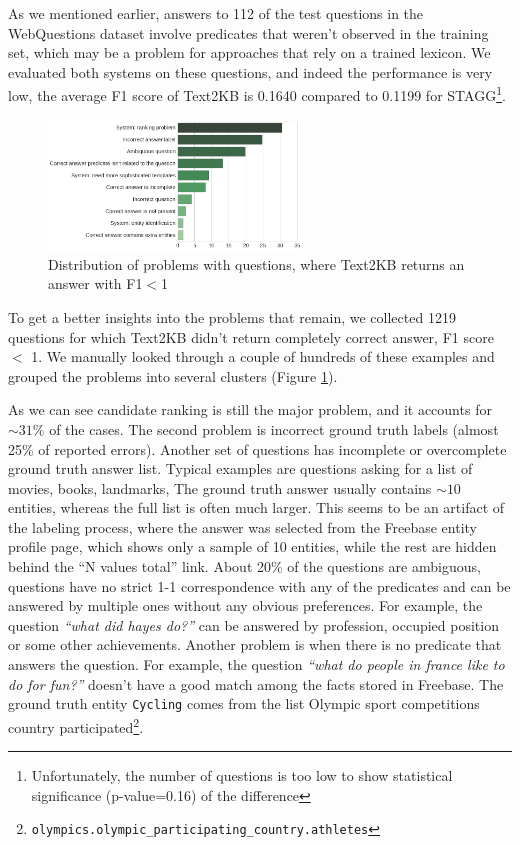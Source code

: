 As we mentioned earlier, answers to 112 of the test questions in the WebQuestions dataset involve predicates that weren't observed in the training set, which may be a problem for approaches that rely on a trained lexicon.
We evaluated both systems on these questions, and indeed the performance is very low, \ie the average F1 score of Text2KB is 0.1640 compared to 0.1199 for STAGG\footnote{Unfortunately, the number of questions is too low to show statistical significance (p-value=0.16) of the difference}.

\begin{figure}
\centering
\includegraphics[width=0.6\textwidth]{img/error_analysis}
\caption{Distribution of problems with questions, where Text2KB returns an answer with F1$<$1}
\label{figure:text2kb:error_analysis}
\end{figure}

To get a better insights into the problems that remain, we collected 1219 questions for which Text2KB didn't return completely correct answer, \ie F1 score $<$ 1.
We manually looked through a couple of hundreds of these examples and grouped the problems into several clusters (Figure \ref{figure:text2kb:error_analysis}).

As we can see candidate ranking is still the major problem, and it accounts for $\sim31\%$ of the cases.
The second problem is incorrect ground truth labels (almost 25\% of reported errors).
Another set of questions has incomplete or overcomplete ground truth answer list.
Typical examples are questions asking for a list of movies, books, landmarks, \etc
The ground truth answer usually contains $\sim10$ entities, whereas the full list is often much larger.
This seems to be an artifact of the labeling process, where the answer was selected from the Freebase entity profile page, which shows only a sample of 10 entities, while the rest are hidden behind the ``N values total'' link.
About 20\% of the questions are ambiguous, \ie questions have no strict 1-1 correspondence with any of the predicates and can be answered by multiple ones without any obvious preferences.
For example, the question \textit{``what did hayes do?''} can be answered by profession, occupied position or some other achievements.
Another problem is when there is no predicate that answers the question.
For example, the question \textit{``what do people in france like to do for fun?''} doesn't have a good match among the facts stored in Freebase.
The ground truth entity \texttt{Cycling} comes from the list Olympic sport competitions country participated\footnote{\texttt{olympics.olympic\_participating\_country.athletes}}.

